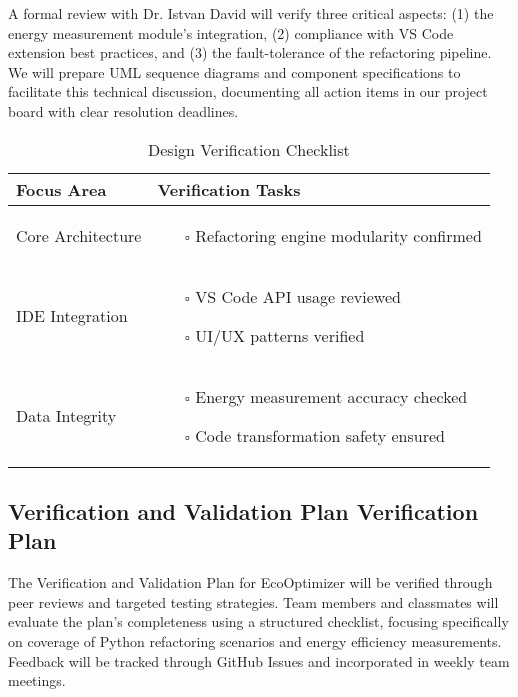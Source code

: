 \documentclass[12pt, titlepage]{article}
\begin{document}
\noindent A formal review with Dr. Istvan David will verify three critical aspects: (1) the energy measurement module's integration, (2) compliance with VS Code extension best practices, and (3) the fault-tolerance of the refactoring pipeline. We will prepare UML sequence diagrams and component specifications to facilitate this technical discussion, documenting all action items in our project board with clear resolution deadlines.

\begin{table}[H]
\centering
\caption{Design Verification Checklist}
\begin{tabular}{|p{}|p{}|}
\hline
\textbf{Focus Area} & \textbf{Verification Tasks} \\ \hline
Core Architecture & \begin{itemize}
\item[$\square$] Refactoring engine modularity confirmed
\end{itemize} \\ \hline
IDE Integration & \begin{itemize}
\item[$\square$] VS Code API usage reviewed
\item[$\square$] UI/UX patterns verified
\end{itemize} \\ \hline
Data Integrity & \begin{itemize}
\item[$\square$] Energy measurement accuracy checked
\item[$\square$] Code transformation safety ensured
\end{itemize} \\ \hline
\end{tabular}
\end{table}

\subsection{Verification and Validation Plan Verification Plan}

The Verification and Validation Plan for EcoOptimizer will be verified through peer reviews and targeted testing strategies. Team members and classmates will evaluate the plan's completeness using a structured checklist, focusing specifically on coverage of Python refactoring scenarios and energy efficiency measurements. Feedback will be tracked through GitHub Issues and incorporated in weekly team meetings.\\
\end{document}
